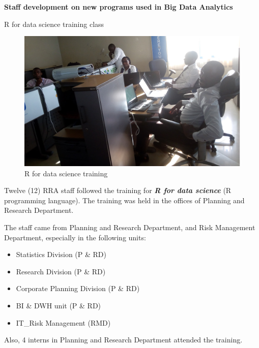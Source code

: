 \documentclass[ignorenonframetext,]{beamer}
\providecommand{\tightlist}{%
  \setlength{\itemsep}{0pt}\setlength{\parskip}{0pt}}
\begin{document}
\begin{frame}

\begin{center}
\textbf{Staff development on new programs used in Big Data Analytics}
\end{center}

\end{frame}

\begin{frame}{R for data science training class}
\protect\hypertarget{r-for-data-science-training-class}{}

\begin{figure}
\centering
\includegraphics{Images/training_1.jpg}
\caption{R for data science training}
\end{figure}

\end{frame}

\begin{frame}

Twelve (12) RRA staff followed the training for
\textit{\textbf{R for data science}} (R programming language). The
training was held in the offices of Planning and Research Department.

The staff came from Planning and Research Department, and Risk
Management Department, especially in the following units:

\begin{itemize}
\tightlist
\item
  Statistics Division (P \& RD)
\item
  Research Division (P \& RD)
\item
  Corporate Planning Division (P \& RD)
\item
  BI \& DWH unit (P \& RD)
\item
  IT\_Risk Management (RMD)
\end{itemize}

Also, 4 interns in Planning and Research Department attended the
training.

\end{frame}
\end{document}
